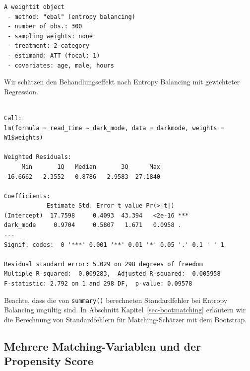 \documentclass[
  a4paper,
  DIV=11,
  oneside]{scrreprt}
\newenvironment{Shaded}{\begin{snugshade}}{\end{snugshade}}
\newcommand{\AttributeTok}[1]{\textcolor[rgb]{0.40,0.45,0.13}{#1}}
\newcommand{\CommentTok}[1]{\textcolor[rgb]{0.37,0.37,0.37}{#1}}
\newcommand{\FunctionTok}[1]{\textcolor[rgb]{0.28,0.35,0.67}{#1}}
\newcommand{\NormalTok}[1]{\textcolor[rgb]{0.00,0.23,0.31}{#1}}
\newcommand{\OtherTok}[1]{\textcolor[rgb]{0.00,0.23,0.31}{#1}}
\newcommand{\SpecialCharTok}[1]{\textcolor[rgb]{0.37,0.37,0.37}{#1}}
\begin{document}
\begin{verbatim}
A weightit object
 - method: "ebal" (entropy balancing)
 - number of obs.: 300
 - sampling weights: none
 - treatment: 2-category
 - estimand: ATT (focal: 1)
 - covariates: age, male, hours
\end{verbatim}

Wir schätzen den Behandlungseffekt nach Entropy Balancing mit
gewichteter Regression.

\begin{Shaded}
\end{Shaded}

\begin{verbatim}

Call:
lm(formula = read_time ~ dark_mode, data = darkmode, weights = W1$weights)

Weighted Residuals:
     Min       1Q   Median       3Q      Max 
-16.6662  -2.3552   0.8786   2.9583  27.1840 

Coefficients:
            Estimate Std. Error t value Pr(>|t|)    
(Intercept)  17.7598     0.4093  43.394   <2e-16 ***
dark_mode     0.9704     0.5807   1.671   0.0958 .  
---
Signif. codes:  0 '***' 0.001 '**' 0.01 '*' 0.05 '.' 0.1 ' ' 1

Residual standard error: 5.029 on 298 degrees of freedom
Multiple R-squared:  0.009283,  Adjusted R-squared:  0.005958 
F-statistic: 2.792 on 1 and 298 DF,  p-value: 0.09578
\end{verbatim}

Beachte, dass die von \texttt{summary()} berechneten Standardfehler bei
Entropy Balancing ungültig sind. In Abschnitt
Kapitel~\ref{sec-bootmatching} erläutern wir die Berechnung von
Standardfehlern für Matching-Schätzer mit dem Bootstrap.

\hypertarget{sec-PSM}{%
\subsection{Mehrere Matching-Variablen und der Propensity
Score}\label{sec-PSM}}
\end{document}
